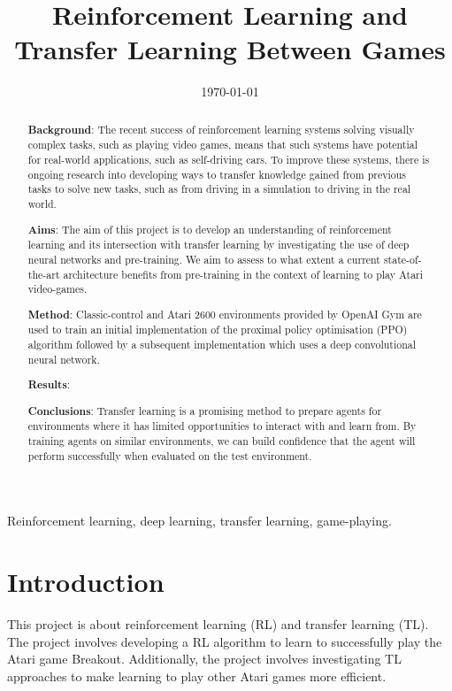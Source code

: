 \documentclass[12pt,a4paper]{article}
\title{Reinforcement Learning and \\ Transfer Learning Between Games}
\author{} %
\date{\today}
\begin{document}
\maketitle

\begin{abstract}
{\bf Background}: The recent success of reinforcement learning systems solving visually complex tasks, such as playing video games, means that such systems have potential for real-world applications, such as self-driving cars. To improve these systems, there is ongoing research into developing ways to transfer knowledge gained from previous tasks to solve new tasks, such as from driving in a simulation to driving in the real world.

{\bf Aims}: The aim of this project is to develop an understanding of reinforcement learning and its intersection with transfer learning by investigating the use of deep neural networks and pre-training. We aim to assess to what extent a current state-of-the-art architecture benefits from pre-training in the context of learning to play Atari video-games.

{\bf Method}: Classic-control and Atari 2600 environments provided by OpenAI Gym are used to train an initial implementation of the proximal policy optimisation (PPO) algorithm followed by a subsequent implementation which uses a deep convolutional neural network.

{\bf Results}: 

{\bf Conclusions}: Transfer learning is a promising method to prepare agents for environments where it has limited opportunities to interact with and learn from. By training agents on similar environments, we can build confidence that the agent will perform successfully when evaluated on the test environment.
\end{abstract}

\begin{keywords}
Reinforcement learning, deep learning, transfer learning, game-playing.
\end{keywords}

\section{Introduction}
This project is about reinforcement learning (RL) and transfer learning (TL). The project involves developing a RL algorithm to learn to successfully play the Atari game Breakout. Additionally, the project involves investigating TL approaches to make learning to play other Atari games more efficient. 
\end{document}
